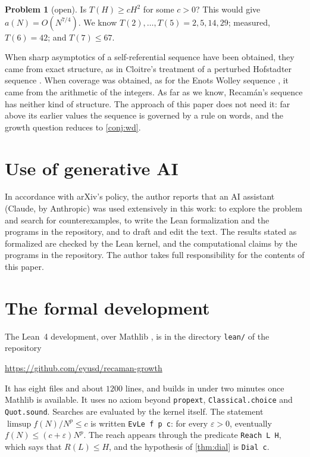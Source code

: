 \documentclass[11pt]{amsart}
\theoremstyle{definition}
\newtheorem{problem}[theorem]{Problem}
\newcommand{\eps}{\varepsilon}
\newcommand{\lean}[1]{\texttt{#1}}
\begin{document}
\begin{problem}[open]
Is $T(H)\ge cH^2$ for some $c>0$? This would give $a(N)=O(N^{7/4})$. We know $T(2),\dots,T(5)=2,5,14,29$; measured, $T(6)=42$; and $T(7)\le67$.
\end{problem}

When sharp asymptotics of a self-referential sequence have been obtained, they came from exact structure, as in Cloitre's
treatment of a perturbed Hofstadter sequence \cite{Cloitre2026}. When coverage was obtained, as for the Enots
Wolley sequence \cite{Nichols2026}, it came from the arithmetic of the integers. As far as we know, Recam\'an's sequence has neither kind of structure. The approach of this paper does not need it: far
above its earlier values the sequence is governed by a rule on words, and the growth question reduces to \cref{conj:wd}.

\section*{Use of generative AI}
In accordance with arXiv's policy, the author reports that an AI assistant (Claude, by Anthropic) was used extensively in this
work: to explore the problem and search for counterexamples, to write the Lean formalization and the programs in the repository,
and to draft and edit the text. The results stated as formalized are checked by the Lean kernel, and the computational claims by
the programs in the repository. The author takes full responsibility for the contents of this paper.

\appendix

\section{The formal development}\label{app:lean}

The Lean~4 \cite{Lean4} development, over Mathlib \cite{Mathlib2020}, is in the directory \lean{lean/} of the repository
\begin{center}\url{https://github.com/eyusd/recaman-growth}\end{center}
It has eight files and about $1200$ lines, and builds in under two minutes once Mathlib is available. It uses no axiom beyond
\lean{propext}, \lean{Classical.choice} and \lean{Quot.sound}. Searches are evaluated by the kernel itself. The statement $\limsup f(N)/N^p\le c$
is written \mbox{\lean{EvLe f p c}}: for every $\eps>0$, eventually $f(N)\le(c+\eps)N^p$. The reach appears through the predicate
\mbox{\lean{Reach L H}}, which says that $R(L)\le H$, and the hypothesis of \cref{thm:dial} is \lean{Dial c}.
\end{document}
